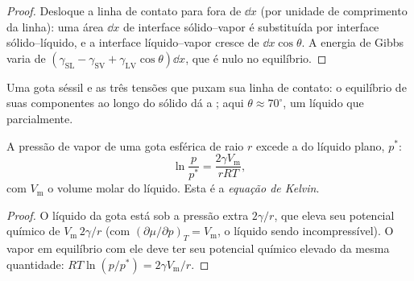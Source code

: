 \begin{proof}
Desloque a linha de contato para fora de $\dd x$ (por unidade de comprimento da linha):
uma área $\dd x$ de interface sólido--vapor é substituída por interface sólido--líquido,
e a interface líquido--vapor cresce de $\dd x\cos\theta$. A energia de Gibbs varia de
$(\gamma_{\mathrm{SL}} - \gamma_{\mathrm{SV}} + \gamma_{\mathrm{LV}}\cos\theta)\dd x$, que é nulo no equilíbrio.
\end{proof}

\begin{omfigure}

{\small Uma gota séssil e as três tensões que puxam sua linha de contato: o
equilíbrio de suas componentes ao longo do sólido dá a ; aqui $\theta
\approx 70^\circ$, um líquido que  parcialmente.}
\end{omfigure}

\begin{theorem}\label{thm:b3:colloids:kelvin}
A pressão de vapor de uma gota esférica de raio $r$ excede a do líquido plano,
$p^*$:
\[
  \ln\frac{p}{p^*} = \frac{2\gamma V_{\mathrm m}}{rRT},
\]
com $V_{\mathrm m}$ o volume molar do líquido. Esta é a \emph{equação de
Kelvin}.
\end{theorem}

\begin{proof}
O líquido da gota está sob a pressão extra $2\gamma/r$, que eleva seu potencial
químico de $V_{\mathrm m}\,2\gamma/r$ (com $(\partial\mu/\partial p)_T = V_{\mathrm m}$, o líquido sendo incompressível).
O vapor em equilíbrio com ele deve ter seu potencial químico elevado da mesma
quantidade: $RT\ln(p/p^*) = 2\gamma V_{\mathrm m}/r$.
\end{proof}

